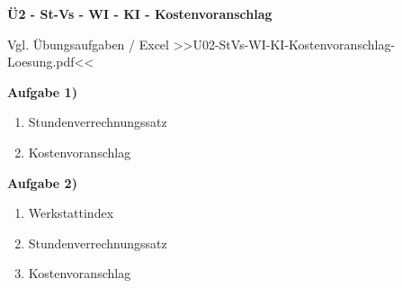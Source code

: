 \textbf{Ü2 - St-Vs - WI - KI - Kostenvoranschlag}

Vgl. Übungsaufgaben / Excel
>>U02-StVs-WI-KI-Kostenvoranschlag-Loesung.pdf<<

\textbf{Aufgabe 1)}

\begin{enumerate}
\item
  Stundenverrechnungssatz
\item
  Kostenvoranschlag
\end{enumerate}

\textbf{Aufgabe 2)}

\begin{enumerate}
\item
  Werkstattindex
\item
  Stundenverrechnungssatz
\item
  Kostenvoranschlag
\end{enumerate}
